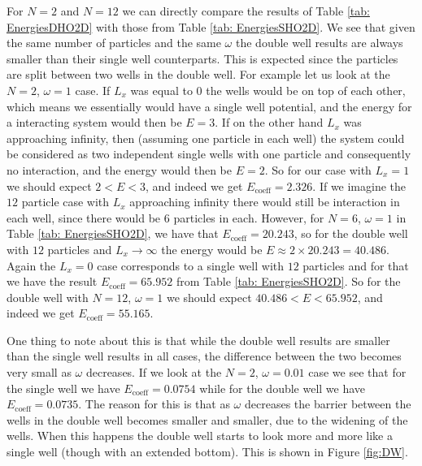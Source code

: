 \documentclass[../main.tex]{subfiles}
\begin{document}
For $N=2$ and $N=12$ we can directly compare the results of Table \ref{tab: EnergiesDHO2D} with those from Table \ref{tab: EnergiesSHO2D}. We see that given the same number of particles and the same $\omega$ the double well results are always smaller than their single well counterparts. This is expected since the particles are split between two wells in the double well. For example let us look at the $N=2$, $\omega = 1$ case. If $L_x$ was equal to $0$ the wells would be on top of each other, which means we essentially would have a single well potential, and the energy for a interacting system would then be $E=3$. If on the other hand $L_x$ was approaching infinity, then (assuming one particle in each well) the system could be considered as two independent single wells with one particle and consequently no interaction, and the energy would then be $E=2$. So for our case with $L_x=1$ we should expect $2<E<3$, and indeed we get $E_\textrm{coeff}=2.326$. If we imagine the $12$ particle case with $L_x$ approaching infinity there would still be interaction in each well, since there would be $6$ particles in each. However, for $N=6$, $\omega=1$ in Table \ref{tab: EnergiesSHO2D}, we have that $E_\textrm{coeff}=20.243$, so for the double well with $12$ particles and $L_x \rightarrow \infty$ the energy would be $E \approx 2\times 20.243 = 40.486$. Again the $L_x=0$ case corresponds to a single well with $12$ particles and for that we have the result $E_\textrm{coeff}=65.952$ from Table \ref{tab: EnergiesSHO2D}. So for the double well with $N=12$, $\omega=1$ we should expect $40.486<E<65.952$, and indeed we get $E_\textrm{coeff}=55.165$.

One thing to note about this is that while the double well results are smaller than the single well results in all cases, the difference between the two becomes very small as $\omega$ decreases. If we look at the $N=2$, $\omega=0.01$ case we see that for the single well we have $E_\textrm{coeff}=0.0754$ while for the double well we have $E_\textrm{coeff}=0.0735$. The reason for this is that as $\omega$ decreases the barrier between the wells in the double well becomes smaller and smaller, due to the widening of the wells. When this happens the double well starts to look more and more like a single well (though with an extended bottom). This is shown in Figure \ref{fig:DW}.
\end{document}
